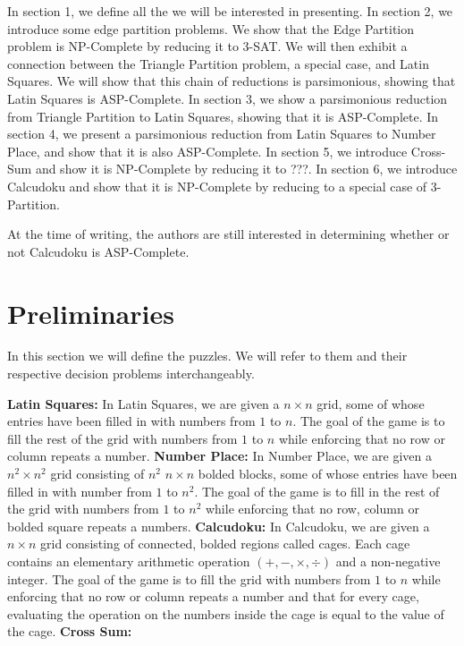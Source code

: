 \documentclass[runningheads,a4paper]{llncs}
\begin{document}
In section 1, we define all the we will be interested in presenting. In section 2, we introduce some edge partition problems. We show that the Edge Partition problem is NP-Complete by reducing it to 3-SAT. We will then exhibit a connection between the Triangle Partition problem, a special case, and Latin Squares. We will show that this chain of reductions is parsimonious, showing that Latin Squares is ASP-Complete. In section 3, we show a parsimonious reduction from Triangle Partition to Latin Squares, showing that it is ASP-Complete. In section 4, we present a parsimonious reduction from Latin Squares to Number Place, and show that it is also ASP-Complete. In section 5, we introduce Cross-Sum and show it is NP-Complete by reducing it to ???. In section 6, we introduce Calcudoku and show that it is NP-Complete by reducing to a special case of 3-Partition.

At the time of writing, the authors are still interested in determining whether or not Calcudoku is ASP-Complete. 

\section{Preliminaries} 

In this section we will define the puzzles. We will refer to them and their respective decision problems interchangeably. 

\textbf{Latin Squares:} In Latin Squares, we are given a $n \times n$ grid, some of whose entries have been filled in with numbers from $1$ to $n$. The goal of the game is to fill the rest of the grid with numbers from $1$ to $n$ while enforcing that no row or column repeats a number. 
\newline
\textbf{Number Place:} In Number Place, we are given a $n^2 \times n^2$ grid consisting of $n^2$ $n \times n$ bolded blocks, some of whose entries have been filled in with number from $1$ to $n^2$. The goal of the game is to fill in the rest of the grid with numbers from $1$ to $n^2$ while enforcing that no row, column or bolded square repeats a numbers. 
\newline
\textbf{Calcudoku:} In Calcudoku, we are given a $n \times n$ grid consisting of connected, bolded regions called cages. Each cage contains an elementary arithmetic operation $(+, -, \times, \div)$ and a non-negative integer. The goal of the game is to fill the grid with numbers from $1$ to $n$ while enforcing that no row or column repeats a number and that for every cage, evaluating the operation on the numbers inside the cage is equal to the value of the cage. 
\newline
\textbf{Cross Sum:} 
\end{document}
